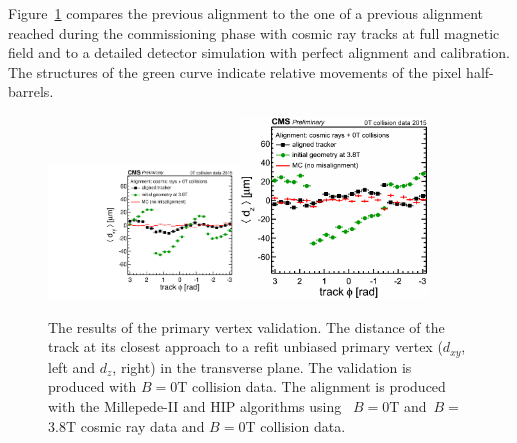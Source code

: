 Figure~\ref{fig:PVvalidation} compares the previous alignment to the one of a previous alignment reached during the commissioning phase with cosmic ray tracks at full magnetic field and to a detailed detector simulation with perfect alignment and calibration. The structures of the green curve indicate relative movements of the pixel half-barrels.

\begin{figure}[htb]
    \begin{center}
        \includegraphics[width=0.45\textwidth]{../figs/Alignment/AlRes_dxyPhiBiasCanvas.pdf}\includegraphics[width=0.45\textwidth]{../figs/Alignment/AlRes_dzPhiBiasCanvas.png}
    \end{center}
    \caption{The results of the primary vertex validation. The distance of the track at its closest approach to a refit unbiased primary vertex ($d_{xy}$, left and $d_z$, right) in the transverse plane. The validation is produced with $B=$0T collision data. The alignment is produced with the Millepede-II and HIP algorithms using ~$B=$0T and~$B=$3.8T cosmic ray data and $B=$0T collision data. }
    \label{fig:PVvalidation}
\end{figure}


